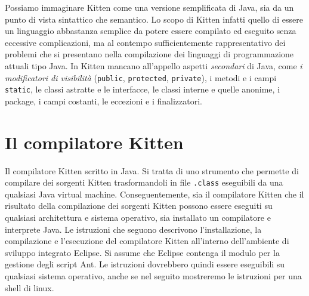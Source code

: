Possiamo immaginare Kitten come una versione semplificata di Java,
sia da un punto di vista sintattico che semantico. Lo scopo di Kitten \e
infatti quello di essere un linguaggio abbastanza semplice da potere essere
compilato ed eseguito senza eccessive complicazioni, ma al contempo
sufficientemente rappresentativo dei problemi che si presentano nella
compilazione dei linguaggi di programmazione attuali tipo Java.
In Kitten mancano all'appello aspetti \emph{secondari} di Java, come
\emph{i modificatori di visibilit\`a} (\texttt{public}, \texttt{protected},
\texttt{private}), i metodi e i campi \texttt{static}, le classi
astratte e le interfacce, le classi interne e quelle anonime,
i package, i campi costanti, le eccezioni e i finalizzatori.

%
\section{Il compilatore Kitten}\label{sec:kitten_compiler}
%
Il compilatore Kitten \e scritto in Java. Si tratta di
uno strumento che permette di compilare dei sorgenti Kitten trasformandoli
in file \texttt{.class} eseguibili da una qualsiasi Java virtual machine.
Conseguentemente, sia il compilatore Kitten che il risultato della
compilazione dei sorgenti Kitten possono essere eseguiti su qualsiasi
architettura e sistema operativo, \purche sia installato un compilatore
e interprete Java. Le istruzioni che seguono descrivono l'installazione,
la compilazione e l'esecuzione del compilatore Kitten all'interno dell'ambiente
di sviluppo integrato Eclipse. Si assume che Eclipse contenga il modulo per
la gestione degli script Ant. Le istruzioni dovrebbero quindi essere eseguibili
su qualsiasi sistema operativo, anche se nel seguito mostreremo le istruzioni
per una shell di linux.

